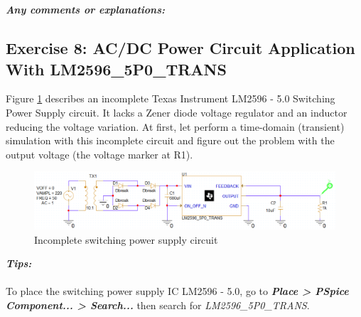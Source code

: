 \begin{itemize}
          \\
          \vspace{8cm}
          \\
          \textbf{\textit{Any comments or explanations:}}
          \dotfill\bigskip\par\mbox{}\dotfill
          \dotfill\bigskip\par\mbox{}\dotfill
          \dotfill\bigskip\par\mbox{}\dotfill
          \dotfill\bigskip\par\mbox{}\dotfill
          \dotfill\bigskip\par\mbox{}\dotfill
          \dotfill\bigskip\par\mbox{}\dotfill
\end{itemize}

\newpage

\subsection{Exercise 8:  AC/DC Power Circuit Application With LM2596\_5P0\_TRANS}
Figure \ref{incomplete2596} describes an incomplete Texas Instrument LM2596 - 5.0 Switching Power Supply circuit. It lacks a Zener diode voltage regulator and an inductor reducing the voltage variation. At first, let perform a time-domain (transient) simulation with this incomplete circuit and figure out the problem with the output voltage (the voltage marker at R1).

\begin{figure}[H]
    \centering
    \includegraphics[width=18cm]{source/picture/bai_2/lab2_ex10_step1.png}
    \caption{Incomplete switching power supply circuit}
    \label{incomplete2596}
\end{figure}

\textbf{\textit{Tips:}}\\
\\
To place the switching power supply IC LM2596 - 5.0, go to \textbf{\textit{Place > PSpice Component... > Search...}} then search for \textit{LM2596\_5P0\_TRANS}.

